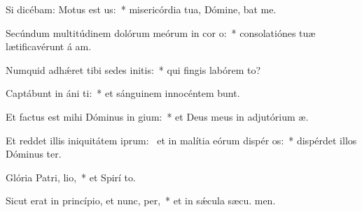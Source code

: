 \item Si dicébam: Motus est  us:~* misericórdia tua, Dómine, bat me.
\item Secúndum multitúdinem dolórum meórum in cor o:~* consolatiónes tuæ lætificavérunt á am.
\item Numquid adhǽret tibi sedes initis:~* qui fingis labórem  to?
\item Captábunt in áni ti:~* et sánguinem innocéntem bunt.
\item Et factus est mihi Dóminus in gium:~* et Deus meus in adjutórium  æ.
\item Et reddet illis iniquitátem iprum:~\pscross{} et in malítia eórum dispér os:~* dispérdet illos Dóminus  ter.
\item Glória Patri,  lio,~* et Spirí to.
\item Sicut erat in princípio, et nunc,  per,~* et in sǽcula sæcu. men.
